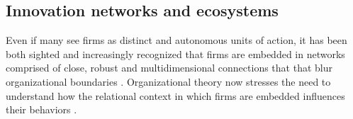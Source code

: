 \documentclass[CHICAGO,Times1COL]{WileyNJDv5} %
\begin{document}
\subsection{Innovation networks and ecosystems}



%


Even if many see firms as distinct and autonomous units of action, it has been both sighted and increasingly recognized that firms are embedded in networks comprised of close, robust and multidimensional connections that  that blur organizational boundaries \citep{BorgattiHalgin2011,Powell2014a,rowley2004competing,gilsing2008network}. %
Organizational theory now stresses the need to understand how the relational context in which firms are embedded influences their behaviors %
\citep{gulati1998alliances,rowley2004competing}.
\end{document}
